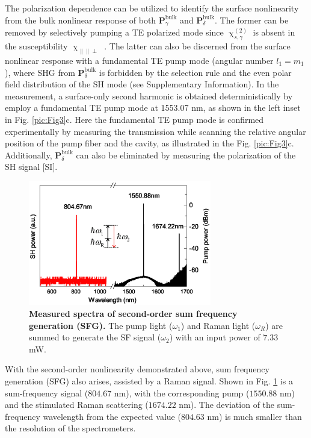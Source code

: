 \documentclass[a4paper,8pt,hyperref, twocolumn]{article}
\begin{document}
The polarization dependence can be utilized to identify the surface nonlinearity from the bulk nonlinear response of both $\mathbf{P}^{\mathrm{bulk}}_\gamma$ and $\mathbf{P}^{\mathrm{bulk}}_\delta$. 
The former can be removed by selectively pumping a TE polarized mode since $\upchi^{(2)}_{s,\gamma}$ is absent in the susceptibility $\upchi_{\parallel \parallel \perp}$ \cite{heinz1991second}. 
The latter can also be discerned from the surface nonlinear response with a fundamental TE pump mode (angular number $l_1=m_1$), where SHG from $\mathbf{P}^{\mathrm{bulk}}_\delta$ is forbidden by the selection rule and the even polar field distribution of the SH mode (see Supplementary Information).  
In the measurement, a surface-only second harmonic is obtained deterministically by employ a fundamental TE pump mode at 1553.07 nm, as shown in the left inset in Fig. \ref{pic:Fig3}c.
Here the fundamental TE pump mode is confirmed experimentally by measuring the transmission while scanning the relative angular position of the pump fiber and the cavity, as illustrated in the  Fig. \ref{pic:Fig3}c.
Additionally, $\mathbf{P}^{\mathrm{bulk}}_\delta$ can also be eliminated by measuring the polarization of the SH signal [SI]. 

\begin{figure}[!ht]
\centering
\includegraphics[width=8cm]{Fig4.eps}
\caption{\textbf{Measured spectra of second-order sum frequency generation (SFG). }The pump light ($\omega_1$) and Raman light ($\omega_R$) are summed to generate the SF signal ($\omega_2$) with an input power of $7.33$ mW.}
\label{pic:Fig4}
\end{figure}

With the second-order nonlinearity demonstrated above, sum frequency generation (SFG) also arises, assisted by a Raman signal. 
Shown in Fig. \ref{pic:Fig4} is a sum-frequency signal ($804.67$ nm), with the corresponding pump ($1550.88$ nm) and the stimulated Raman scattering ($1674.22$ nm).
The deviation of the sum-frequency wavelength from the expected value ($804.63$ nm) is much smaller than the resolution of the spectrometers.
\end{document}
